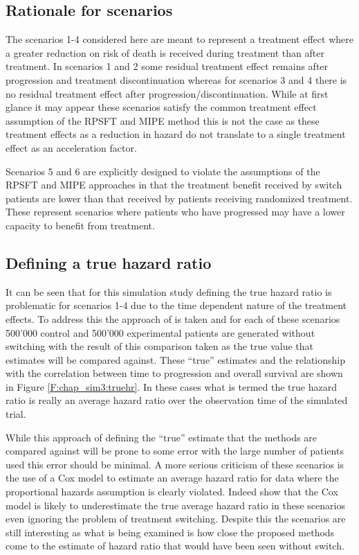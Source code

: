 \subsection{Rationale for scenarios}

The scenarios 1-4 considered here are meant to represent a treatment effect where a greater reduction on risk of death is received during treatment than after treatment. In scenarios 1 and 2 some residual treatment effect remains after progression and treatment discontinuation whereas for scenarios 3 and 4 there is no residual treatment effect after progression/discontinuation. While at first glance it may appear these scenarios satisfy the common treatment effect assumption of the RPSFT and MIPE method this is not the case as these treatment effects as a reduction in hazard do not translate to a single treatment effect as an acceleration factor. 

Scenarios 5 and 6 are explicitly designed to violate the assumptions of the RPSFT and MIPE approaches in that the treatment benefit received by switch patients are lower than that received by patients receiving randomized treatment. These represent scenarios where patients who have progressed may have a lower capacity to benefit from treatment.

\subsection{Defining a true hazard ratio}


It can be seen that for this simulation study defining the true hazard ratio is problematic for scenarios 1-4 due to the time dependent nature of the treatment effects. To address this the approach of \cite{Latimer2016} is taken and for each of these scenarios 500'000 control and 500'000 experimental patients are generated without switching with the result of this comparison taken as the true value that estimates will be compared against. These ``true'' estimates and the relationship with the correlation between time to progression and overall survival are shown in Figure \ref{F:chap_sim3:truehr}. In these cases what is termed the true hazard ratio is really an average hazard ratio over the observation time of the simulated trial. 

While this approach of defining the ``true'' estimate that the methods are compared against will be prone to some error with the large number of patients used this error should be minimal. A more serious criticism of these scenarios is the use of a Cox model to estimate an average hazard ratio for data where the proportional hazards assumption is clearly violated. Indeed \cite{Schemper1992} show that the Cox model is likely to underestimate the true average hazard ratio in these scenarios even ignoring the problem of treatment switching. Despite this the scenarios are still interesting as what is being examined is how close the proposed methods come to the estimate of hazard ratio that would have been seen without switch. 

